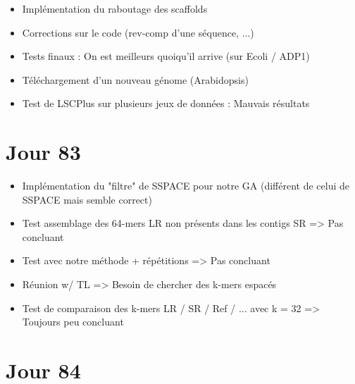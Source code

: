 \documentclass[12pt]{report}
\begin{document}
\begin{itemize}
	\item Implémentation du raboutage des scaffolds
	
	\item Corrections sur le code (rev-comp d'une séquence, ...)
	
	\item Tests finaux : On est meilleurs quoiqu'il arrive (sur Ecoli / ADP1)
	
	\item Téléchargement d'un nouveau génome (Arabidopsis)
	
	\item Test de LSCPlus sur plusieurs jeux de données : Mauvais résultats
\end{itemize}

\section{Jour 83}

\begin{itemize}
	\item Implémentation du "filtre" de SSPACE pour notre GA (différent de celui de SSPACE mais semble correct)
	
	\item Test assemblage des 64-mers LR non présents dans les contigs SR => Pas concluant
	
	\item Test avec notre méthode + répétitions => Pas concluant
	
	\item Réunion w/ TL => Besoin de chercher des k-mers espacés
	
	\item Test de comparaison des k-mers LR / SR / Ref / ... avec k = 32 => Toujours peu concluant
\end{itemize}

\section{Jour 84}
\end{document}
